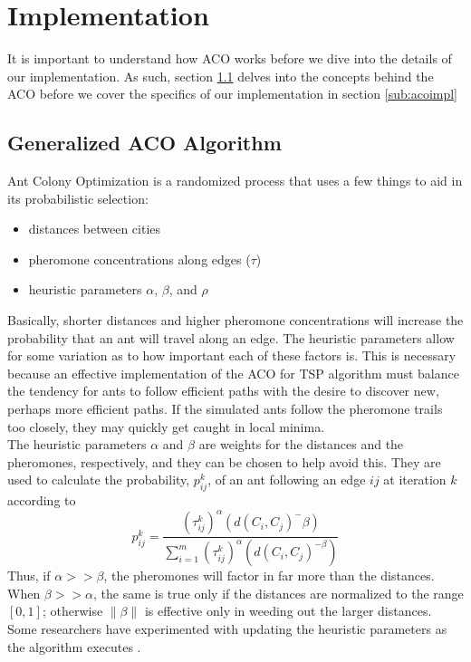 \documentclass[twocolumn]{article}
\begin{document}
\section{Implementation} \label{sec:impl}

It is important to understand how ACO works before we dive into 
the details of our implementation. As such, section \ref{sub:aco} delves
into the concepts behind the ACO before we cover the
specifics of our implementation in section \ref{sub:acoimpl}

\subsection{Generalized ACO Algorithm} \label{sub:aco}

Ant Colony Optimization is a randomized process that uses a few things to aid
in its probabilistic selection:
\begin{itemize}
\item distances between cities
\item pheromone concentrations along edges ($\tau$)
\item heuristic parameters $\alpha$, $\beta$, and $\rho$
\end{itemize}
Basically, shorter distances and higher pheromone concentrations will
increase the probability that an ant will travel along an edge. The 
heuristic parameters allow for some variation as to how important 
each of these factors is. This is necessary because an effective 
implementation of the ACO for TSP algorithm must balance the tendency
for ants to follow efficient paths with the desire to discover new, 
perhaps more efficient paths. If the simulated ants follow the 
pheromone trails too closely, they may quickly get caught in local
minima. \\

The heuristic parameters $\alpha$ and $\beta$ are weights for the distances and 
the pheromones, respectively, and they can be chosen to help avoid this. They 
are used to calculate the probability, $p^k_{ij}$, of an ant following an edge
$ij$ at iteration $k$ according to 
\begin{equation}
p_{ij}^k = \frac{(\tau^k_{ij})^\alpha(d(C_i,C_j)^-\beta)}{\sum_{i=1}^m 
  (\tau^k_{ij})^\alpha(d(C_i,C_j)^{-\beta})} \label{eq:probs}
\end{equation}
Thus, if $\alpha >> \beta$, the pheromones will factor in far more than the
distances. When $\beta >> \alpha$, the same is true only if the distances are 
normalized to the range $[0,1]$; otherwise $\|\beta\|$ is effective only in 
weeding out the larger distances. Some researchers have experimented with 
updating the heuristic parameters as the algorithm executes \cite{ipcsit:aco}.\\
\end{document}

